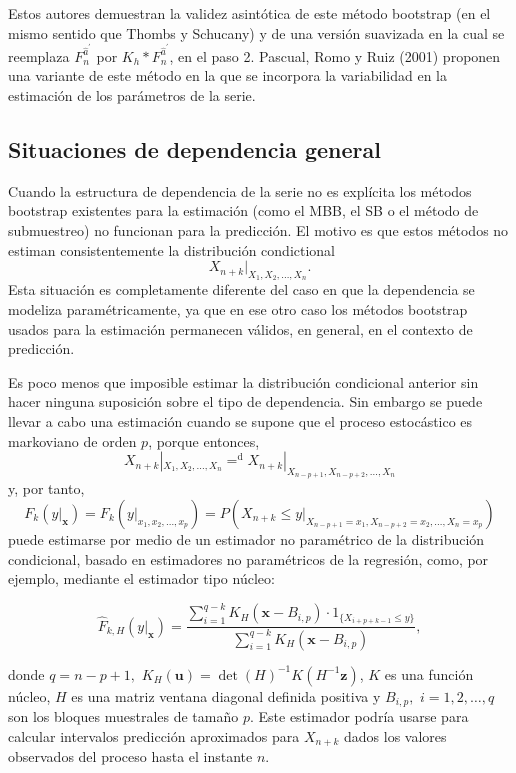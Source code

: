 \documentclass[
]{book}
\theoremstyle{break}
\theoremstyle{definition}
\theoremstyle{definition}
\theoremstyle{definition}
\theoremstyle{remark}
\begin{document}
Estos autores demuestran la validez asintótica de este método bootstrap
(en el mismo sentido que Thombs y Schucany) y de una versión suavizada
en la cual se reemplaza \(F_n^{\widehat{a}^{\prime}}\) por
\(K_{h}\ast F_n^{\widehat{a}^{\prime}}\), en el paso 2. Pascual, Romo y
Ruiz (2001) proponen una variante de este método en la que se incorpora
la variabilidad en la estimación de los parámetros de la serie.

\hypertarget{situaciones-de-dependencia-general-2}{%
\subsection{Situaciones de dependencia general}\label{situaciones-de-dependencia-general-2}}

Cuando la estructura de dependencia de la serie no es explícita los
métodos bootstrap existentes para la estimación (como el MBB, el SB o el
método de submuestreo) no funcionan para la predicción. El motivo es que
estos métodos no estiman consistentemente la distribución condictional
\[X_{n+k}|_{X_1,X_2,\ldots ,X_n}.\]
Esta situación es
completamente diferente del caso en que la dependencia se modeliza
paramétricamente, ya que en ese otro caso los métodos bootstrap usados
para la estimación permanecen válidos, en general, en el contexto de
predicción.

Es poco menos que imposible estimar la distribución condicional anterior
sin hacer ninguna suposición sobre el tipo de dependencia. Sin embargo
se puede llevar a cabo una estimación cuando se supone que el proceso
estocástico es markoviano de orden \(p\), porque entonces,
\[X_{n+k}|_{X_1,X_2,\ldots ,X_n}{=}^{\mathrm{d}
}X_{n+k}|_{X_{n-p+1},X_{n-p+2},\ldots ,X_n}\]
y, por tanto,
\[F_{k}(y|_{\mathbf{x}})=F_{k}(y|_{x_1,x_2,\ldots ,x_{p}})=P\left(
X_{n+k}\leq y|_{X_{n-p+1}=x_1,X_{n-p+2}=x_2,\ldots ,X_n=x_{p}} \right)\]
puede estimarse por medio de un estimador no paramétrico de la distribución
condicional, basado en estimadores no paramétricos de la regresión,
como, por ejemplo, mediante el estimador tipo núcleo:

\[\widehat{F}_{k,H}(y|_{\mathbf{x}})=\frac{\sum_{i=1}^{q-k}K_{H}(\mathbf{x}
-B_{i,p})\cdot 1_{\{X_{i+p+k-1}\leq y\}}}{\sum_{i=1}^{q-k}K_{H}(\mathbf{x}
-B_{i,p})},\]

donde \(q=n-p+1,\) \(K_{H}(\mathbf{u})=\det (H)^{-1}K(H^{-1}\mathbf{z})\), \(K\) es
una función núcleo, \(H\) es una matriz ventana diagonal definida positiva
y \(B_{i,p},\) \(i=1,2,\ldots ,q\) son los bloques muestrales de tamaño \(p\).
Este estimador podría usarse para calcular intervalos predicción
aproximados para \(X_{n+k}\) dados los valores observados del proceso
hasta el instante \(n\).
\end{document}
